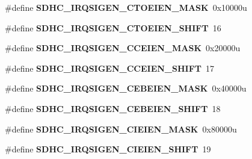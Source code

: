\begin{DoxyCompactItemize}
\item 
\hypertarget{group___s_d_h_c___register___masks_ga244279ea7f9e5ef02942b303764ea87f}{}\#define {\bfseries S\+D\+H\+C\+\_\+\+I\+R\+Q\+S\+I\+G\+E\+N\+\_\+\+C\+T\+O\+E\+I\+E\+N\+\_\+\+M\+A\+S\+K}~0x10000u\label{group___s_d_h_c___register___masks_ga244279ea7f9e5ef02942b303764ea87f}

\item 
\hypertarget{group___s_d_h_c___register___masks_gab06cfed0d752fd51ab5e2eea99832192}{}\#define {\bfseries S\+D\+H\+C\+\_\+\+I\+R\+Q\+S\+I\+G\+E\+N\+\_\+\+C\+T\+O\+E\+I\+E\+N\+\_\+\+S\+H\+I\+F\+T}~16\label{group___s_d_h_c___register___masks_gab06cfed0d752fd51ab5e2eea99832192}

\item 
\hypertarget{group___s_d_h_c___register___masks_ga3d875f5185d1fb805a87aa0c0737ded7}{}\#define {\bfseries S\+D\+H\+C\+\_\+\+I\+R\+Q\+S\+I\+G\+E\+N\+\_\+\+C\+C\+E\+I\+E\+N\+\_\+\+M\+A\+S\+K}~0x20000u\label{group___s_d_h_c___register___masks_ga3d875f5185d1fb805a87aa0c0737ded7}

\item 
\hypertarget{group___s_d_h_c___register___masks_ga2bc72b9a24dfa8dbae34157775b493c7}{}\#define {\bfseries S\+D\+H\+C\+\_\+\+I\+R\+Q\+S\+I\+G\+E\+N\+\_\+\+C\+C\+E\+I\+E\+N\+\_\+\+S\+H\+I\+F\+T}~17\label{group___s_d_h_c___register___masks_ga2bc72b9a24dfa8dbae34157775b493c7}

\item 
\hypertarget{group___s_d_h_c___register___masks_ga200f2b394bdfd0e097f4ad4c496ff2d6}{}\#define {\bfseries S\+D\+H\+C\+\_\+\+I\+R\+Q\+S\+I\+G\+E\+N\+\_\+\+C\+E\+B\+E\+I\+E\+N\+\_\+\+M\+A\+S\+K}~0x40000u\label{group___s_d_h_c___register___masks_ga200f2b394bdfd0e097f4ad4c496ff2d6}

\item 
\hypertarget{group___s_d_h_c___register___masks_ga1b7ce68e7e1e9354fd70b85ffe1625a1}{}\#define {\bfseries S\+D\+H\+C\+\_\+\+I\+R\+Q\+S\+I\+G\+E\+N\+\_\+\+C\+E\+B\+E\+I\+E\+N\+\_\+\+S\+H\+I\+F\+T}~18\label{group___s_d_h_c___register___masks_ga1b7ce68e7e1e9354fd70b85ffe1625a1}

\item 
\hypertarget{group___s_d_h_c___register___masks_ga3a09f7cd7b41c260dd89ea77a1511005}{}\#define {\bfseries S\+D\+H\+C\+\_\+\+I\+R\+Q\+S\+I\+G\+E\+N\+\_\+\+C\+I\+E\+I\+E\+N\+\_\+\+M\+A\+S\+K}~0x80000u\label{group___s_d_h_c___register___masks_ga3a09f7cd7b41c260dd89ea77a1511005}

\item 
\hypertarget{group___s_d_h_c___register___masks_gae0d92453706b49294eac23eb53e2c742}{}\#define {\bfseries S\+D\+H\+C\+\_\+\+I\+R\+Q\+S\+I\+G\+E\+N\+\_\+\+C\+I\+E\+I\+E\+N\+\_\+\+S\+H\+I\+F\+T}~19\label{group___s_d_h_c___register___masks_gae0d92453706b49294eac23eb53e2c742}


\end{DoxyCompactItemize}
